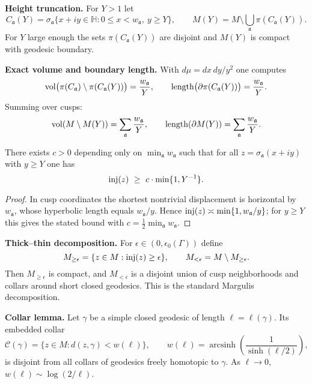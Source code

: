 \medskip

\noindent\textbf{Height truncation.}
For $Y>1$ let
\[
  C_{\mathfrak{a}}(Y)=\sigma_{\mathfrak{a}}\{x+iy\in\mathbb{H}: 0\le x<w_{\mathfrak{a}},\ y\ge Y\},
  \qquad
  M(Y)=M\setminus\bigcup_{\mathfrak{a}}\pi(C_{\mathfrak{a}}(Y)).
\]
For $Y$ large enough the sets $\pi(C_{\mathfrak{a}}(Y))$ are disjoint and $M(Y)$ is compact with geodesic boundary.

\medskip

\noindent\textbf{Exact volume and boundary length.}
With $d\mu=dx\,dy/y^{2}$ one computes
\[
  \operatorname{vol}\bigl(\pi(C_{\mathfrak{a}})\setminus \pi(C_{\mathfrak{a}}(Y))\bigr)=\frac{w_{\mathfrak{a}}}{Y},
  \qquad
  \operatorname{length}\bigl(\partial \pi(C_{\mathfrak{a}}(Y))\bigr)=\frac{w_{\mathfrak{a}}}{Y}.
\]
Summing over cusps:
\[
  \operatorname{vol}(M\setminus M(Y))=\sum_{\mathfrak{a}}\frac{w_{\mathfrak{a}}}{Y},
  \qquad
  \operatorname{length}(\partial M(Y))=\sum_{\mathfrak{a}}\frac{w_{\mathfrak{a}}}{Y}.
\]

\medskip

\begin{lemma}\label{lem:inj-cusp}
There exists $c>0$ depending only on $\min_{\mathfrak{a}} w_{\mathfrak{a}}$ such that
for all $z=\sigma_{\mathfrak{a}}(x+iy)$ with $y\ge Y$ one has
\[
  \operatorname{inj}(z)\ \ge\ c\cdot \min\{1, Y^{-1}\}.
\]
\end{lemma}

\begin{proof}
In cusp coordinates the shortest nontrivial displacement is horizontal by $w_{\mathfrak{a}}$,
whose hyperbolic length equals $w_{\mathfrak{a}}/y$.
Hence $\operatorname{inj}(z)\asymp \min\{1,w_{\mathfrak{a}}/y\}$; for $y\ge Y$ this gives the stated bound with
$c=\tfrac12 \min_{\mathfrak{a}} w_{\mathfrak{a}}$.
\end{proof}

\medskip

\noindent\textbf{Thick–thin decomposition.}
For $\epsilon\in(0, \epsilon_{0}(\Gamma))$ define
\[
  M_{\ge \epsilon}=\{z\in M:\operatorname{inj}(z)\ge \epsilon\},\qquad
  M_{<\epsilon}=M\setminus M_{\ge \epsilon}.
\]
Then $M_{\ge \epsilon}$ is compact, and $M_{<\epsilon}$ is a disjoint union of cusp neighborhoods
and collars around short closed geodesics. This is the standard Margulis decomposition.

\medskip

\noindent\textbf{Collar lemma.}
Let $\gamma$ be a simple closed geodesic of length $\ell=\ell(\gamma)$.
Its embedded collar
\[
  \mathcal{C}(\gamma)=\{z\in M : d(z,\gamma)< w(\ell)\},\qquad
  w(\ell)=\operatorname{arcsinh}\!\left(\frac{1}{\sinh(\ell/2)}\right),
\]
is disjoint from all collars of geodesics freely homotopic to $\gamma$.
As $\ell\to 0$, $w(\ell)\sim \log(2/\ell)$.

